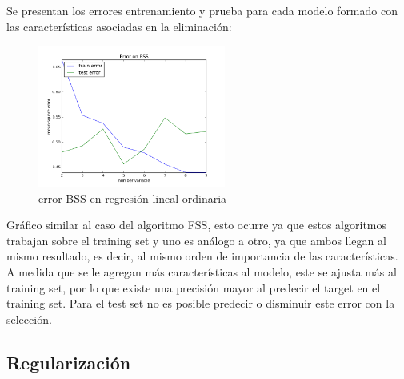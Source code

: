 \documentclass[10pt]{article}
\begin{document}
\begin{itemize}
Se presentan los errores entrenamiento y prueba para cada modelo formado con las características asociadas en la eliminación:

\begin{figure}[!htb]
   \centering
   \includegraphics[width=0.55\textwidth]{images/bss}
   \caption{error BSS en regresión lineal ordinaria}
   \label{fig:mesh1}
\end{figure}

Gráfico similar al caso del algoritmo FSS, esto ocurre ya que estos algoritmos trabajan sobre el training set y uno es análogo a otro, ya que ambos llegan al mismo resultado, es decir, al mismo orden de importancia de las características. \\
A medida que se le agregan más características al modelo, este se ajusta más al training set, por lo que existe una precisión mayor al predecir el target en el training set. Para el test set no es posible predecir o disminuir este error con la selección.\\
\end{itemize}

\subsection{Regularización}
\end{document}
